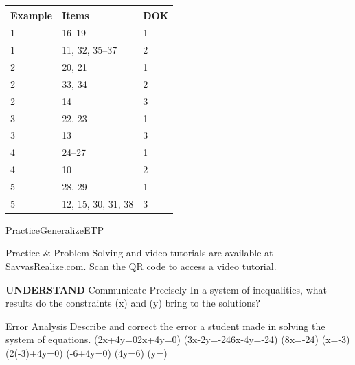 \documentclass{article}
\newenvironment{item-analysis}{}{}      %
\newenvironment{practice}[2]{}{}        %
\newenvironment{te-addendum}[2]{}{}     %
\newcommand{\answer}[1]{}               %
\newcommand{\placeholder}[2]{}          %
\newcommand{\uncertain}[2]{#1}          %
\newcommand{\te}[1]{}                   %
\begin{document}
\begin{item-analysis}
\begin{tabular}{lll}
\toprule
Example & Items & DOK \\
\midrule
1 & 16--19 & 1 \\
1 & 11, 32, 35--37 & 2 \\
2 & 20, 21 & 1 \\
2 & 33, 34 & 2 \\
2 & 14 & 3 \\
3 & 22, 23 & 1 \\
3 & 13 & 3 \\
4 & 24--27 & 1 \\
4 & 10 & 2 \\
5 & 28, 29 & 1 \\
5 & 12, 15, 30, 31, 38 & 3 \\
\bottomrule
\end{tabular}
\end{item-analysis}
\begin{te-addendum}{Practice}{GeneralizeETP}
\te{Printed Item Analysis names Examples 4 and 5 although only Examples 1-3 occur in this lesson; includes item 38 although the practice ends at 37; omits item 9. Assignment Guide also ends at 38. The table is preserved without renumbering. DOK for item 9 is not printed.}
Practice \& Problem Solving and video tutorials are available at SavvasRealize.com. Scan the QR code to access a video tutorial.
\placeholder{illustration}{QR code at upper-right of Practice and Problem Solving, under the Scan the QR code to access a video tutorial banner.}
\end{te-addendum}
\begin{practice}{9}{2}
\textbf{UNDERSTAND} Communicate Precisely In a system of inequalities, what results do the constraints (x) and (y) bring to the solutions?
\answer{The constraints limit the solutions to the first quadrant.}
\te{DOK \uncertain{2}{not printed; item 9 is absent from the Item Analysis table}. The numeric DOK argument is provisional, not a source value.}
\end{practice}
\begin{practice}{10}{2}
Error Analysis Describe and correct the error a student made in solving the system of equations.
(2x+4y=0\Rightarrow2x+4y=0)
(3x-2y=-24\Rightarrow6x-4y=-24)
(8x=-24)
(x=-3)
(2(-3)+4y=0)
(-6+4y=0)
(4y=6)
(y=)
\te{A red X marks the displayed student work.}
\answer{(-24) in the second equation was not multiplied by 2. (-24) should be (-48). The solution is (-6,3).}
\end{practice}
\end{document}
